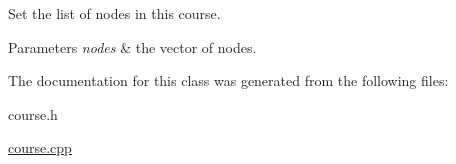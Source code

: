 \-Set the list of nodes in this course. 


\begin{DoxyParams}{\-Parameters}
{\em nodes} & the vector of nodes. \\
\hline
\end{DoxyParams}


\-The documentation for this class was generated from the following files\-:\begin{DoxyCompactItemize}
\item 
course.\-h\item 
\hyperlink{course_8cpp}{course.\-cpp}\end{DoxyCompactItemize}
